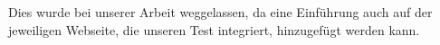 \label{Zusammenfassung_Ausblick} 
Dies wurde bei unserer Arbeit weggelassen, da eine Einführung auch auf der jeweiligen Webseite, die unseren Test integriert, hinzugefügt werden kann. 